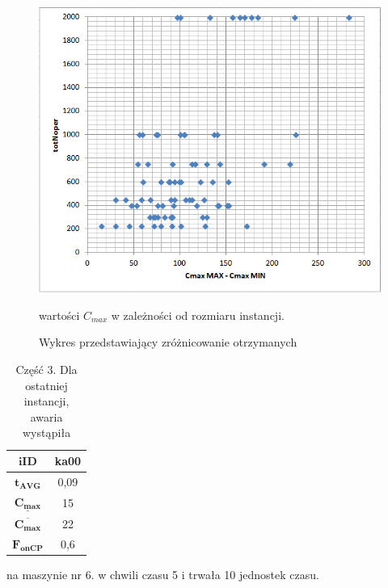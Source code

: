 \documentclass[printmode,oneside]{mgr}
\begin{document}
\begin{figure}[t!]
\begin{center}
\includegraphics[scale=0.68]{rysunki/wykres_cmax_iID.png}
\caption{Wykres przedstawiający zróżnicowanie otrzymanych}{wartości $C_{max}$ w zależności od rozmiaru instancji.}
\label{rys_wykres_cmax_iID}
\end{center}
\end{figure}
%
\begin{table}[ht]
\begin{center}
\renewcommand{\arraystretch}{1.2}
\begin{tabular}{|c|c|}
\hline
$\mathbf{iID}$ & \textbf{ka00}\\
\hline
$\mathbf{t_{AVG}}$ & 0,09\\
\hline
$\mathbf{\underline{C_{max}}}$ & 15\\
\hline
$\mathbf{\overline{C_{max}}}$ & 22\\
\hline
$\mathbf{F_{onCP}}$ & 0,6\\
\hline
\end{tabular}
\caption{Część 3. Dla ostatniej instancji, awaria wystąpiła}{na maszynie nr 6. w chwili czasu 5 i trwała 10 jednostek czasu.}
\label{tab_res_three}
\renewcommand{\arraystretch}{1.0}
\end{center}
\end{table}
%

%
\clearpage
{}
\end{document}
